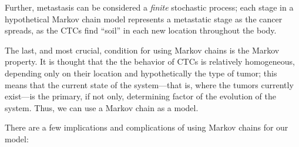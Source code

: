 \documentclass[letterpaper,12pt]{article}
\begin{document}
Further, metastasis can be considered a \emph{finite} stochastic process; each stage in a hypothetical Markov chain model represents a metastatic stage as the cancer spreads, as the CTCs find ``soil'' in each new location throughout the body.

The last, and most crucial, condition for using Markov chains is the Markov property. It is thought that the the behavior of CTCs is relatively homogeneous, depending only on their location and hypothetically the type of tumor; this means that the current state of the system---that is, where the tumors currently exist---is the primary, if not only, determining factor of the evolution of the system. Thus, we can use a Markov chain as a model.

There are a few implications and complications of using Markov chains for our model:
\end{document}
